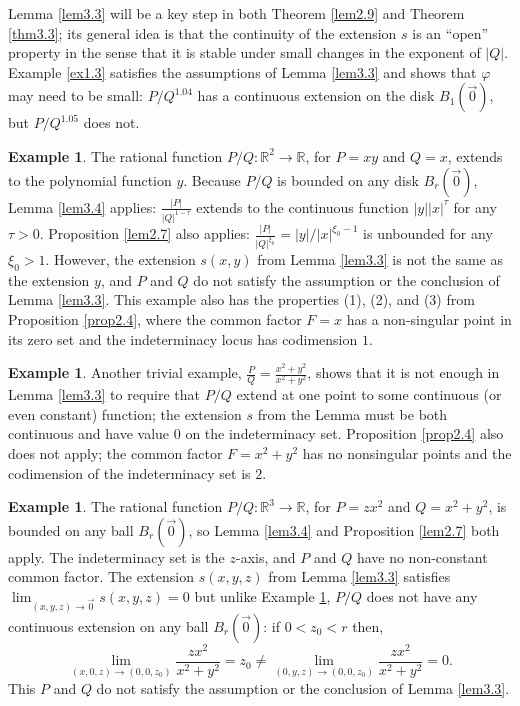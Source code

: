 \documentclass[12pt]{amsart}
\theoremstyle{definition}
\newtheorem{example}[thm]{Example}
\theoremstyle{remark}
\numberwithin{equation}{section}
\newcommand{\re}{\mathbb{R}}
\begin{document}
Lemma \ref{lem3.3} will be a key step in both Theorem \ref{lem2.9} and Theorem \ref{thm3.3}; its general idea is that the continuity of the extension $s$ is an ``open'' property in the sense that it is stable under small changes in the exponent of $|Q|$.  Example \ref{ex1.3} satisfies the assumptions of Lemma \ref{lem3.3} and shows that $\varphi$ may need to be small: $P/Q^{1.04}$ has a continuous extension on the disk $B_1(\vec0)$, but $P/Q^{1.05}$ does not.  
\begin{example}\label{ex2.8}
  The rational function $P/Q:\re^2\to\re$, for $P=xy$ and $Q=x$, extends to the polynomial function $y$.  Because $P/Q$ is bounded on any disk $B_r(\vec0)$, Lemma \ref{lem3.4} applies: $\frac{|P|}{|Q|^{1-\tau}}$ extends to the continuous function $|y||x|^\tau$ for any $\tau>0$.  Proposition \ref{lem2.7} also applies: $\frac{|P|}{|Q|^{\xi_0}}=|y|/|x|^{\xi_0-1}$ is unbounded for any $\xi_0>1$.  However, the extension $s(x,y)$ from Lemma \ref{lem3.3} is not the same as the extension $y$, and $P$ and $Q$ do not satisfy the assumption or the conclusion of Lemma \ref{lem3.3}.  This example also has the properties (1), (2), and (3) from Proposition \ref{prop2.4}, where the common factor $F=x$ has a non-singular point in its zero set and the indeterminacy locus has codimension $1$.
\end{example}
\begin{example}\label{ex2.9}
   Another trivial example, $\displaystyle{\frac PQ=\frac{x^2+y^2}{x^2+y^2}}$, shows that it is not enough in Lemma \ref{lem3.3} to require that $P/Q$ extend at one point to some continuous (or even constant) function; the extension $s$ from the Lemma must be both continuous and have value $0$ on the indeterminacy set.  Proposition \ref{prop2.4} also does not apply; the common factor $F=x^2+y^2$ has no nonsingular points and the codimension of the indeterminacy set is $2$.%
\end{example}
\begin{example}\label{ex2.12}
  The rational function $P/Q:\re^3\to\re$, for $P=zx^2$ and $Q=x^2+y^2$, is bounded on any ball $B_r(\vec0)$, so Lemma \ref{lem3.4} and Proposition \ref{lem2.7} both apply. 
 The indeterminacy set is the $z$-axis, and $P$ and $Q$ have no non-constant common factor.  The extension $s(x,y,z)$ from Lemma \ref{lem3.3} satisfies ${\displaystyle{\lim_{(x,y,z)\to\vec0}s(x,y,z)=0}}$ but unlike Example \ref{ex2.8}, $P/Q$ does not have any continuous extension on any ball $B_r(\vec0)$: if $0<z_0<r$ then, $${\displaystyle{\lim_{(x,0,z)\to(0,0,z_0)}\frac{zx^2}{x^2+y^2}=z_0\ne\lim_{(0,y,z)\to(0,0,z_0)}\frac{zx^2}{x^2+y^2}=0}}.$$  This $P$ and $Q$ do not satisfy the assumption or the conclusion of Lemma \ref{lem3.3}.
\end{example}
\end{document}
